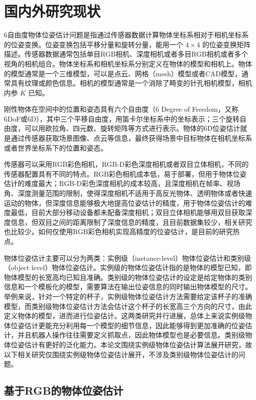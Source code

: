 \chapter{国内外研究现状}
\par 6自由度物体位姿估计问题是指通过传感器数据计算物体坐标系相对于相机坐标系的位姿变换。位姿变换包括平移分量和旋转分量，能用一个 $4\times 4$ 的位姿变换矩阵描述。传感器数据通常包括单目RGB相机、深度相机或者多目RGB相机或者多个视角的相机组合。物体坐标系和相机坐标系分别定义在物体的模型和相机上。物体的模型通常是一个三维模型，可以是点云、网格（mesh）模型或者CAD模型，通常具有纹理或颜色信息。相机的模型通常是一个消除了畸变的针孔相机模型，相机内参 $K$ 已知。
\par 刚性物体在空间中的位置和姿态具有六个自由度（6 Degree of Freedom，又称6DoF或6D），其中三个平移自由度，用笛卡尔坐标系中的坐标表示；三个旋转自由度，可以用欧拉角、四元数、旋转矩阵等方式进行表示。物体的6D位姿估计就是通过传感器获取场景图像、点云等信息，最终获得场景中目标物体在相机坐标系或者世界坐标系下的位置和姿态。
\par 传感器可以采用RGB彩色相机，RGB-D彩色深度相机或者双目立体相机，不同的传感器配置具有不同的特点。RGB彩色相机成本低，易于部署，但用于物体位姿估计的难度最大；RGB-D彩色深度相机的成本较高，且深度相机在帧率、视场角、深度测量范围的限制，使得深度相机不适用于高反光物体、透明物体或者快速运动的物体，但深度信息能够极大地提高位姿估计的精度，用于物体位姿估计的难度最低，目前大部分移动设备都未配备深度相机；双目立体相机能够用双目获取深度信息，但双目之间的距离限制了深度信息的精度，且目前数据集较少，相关研究也比较少。如何仅使用RGB彩色相机实现高精度的位姿估计，是目前的研究热点。

\par 物体位姿估计主要可以分为两类：实例级（instance-level）物体位姿估计和类别级（object level）物体位姿估计。实例级的物体位姿估计指的是物体的模型已知，即物体模型的长宽高均已知且准确。类别级的物体位姿估计的设定是给定物体的类别信息和一个模板化的模型，需要算法在输出位姿信息的同时输出物体模型的尺寸。举例来说，针对一个特定的杯子，实例级物体位姿估计方法需要给定该杯子的准确模型，而类别级物体位姿估计方法会估计这个杯子的长宽高三个方向的尺寸，由此定义物体的模型，进而进行位姿估计。这两类研究并行进展，总体上来说实例级物体位姿估计更能充分利用每一个模型的细节信息，因此能够得到更加准确的位姿估计，并且机器人操作往往需要定义抓取点，因此物体模型也是必要信息。类别级物体位姿估计有更好的泛化能力。本论文围绕实例级物体位姿估计算法展开研究，故以下相关研究仅围绕实例级物体位姿估计展开，不涉及类别级物体位姿估计的问题。
\section{基于RGB的物体位姿估计}
